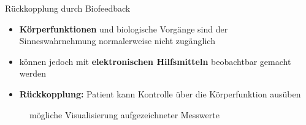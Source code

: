 \documentclass[final,20pt]{beamer}
\newlength{\sepwidth}
\newlength{\colwidth}
\newcommand{\separatorcolumn}{\begin{column}{\sepwidth}\end{column}}
\begin{document}
\begin{frame}[t]
\begin{columns}[t]
\begin{column}{\colwidth}
  \begin{alertblock}{Rückkopplung durch Biofeedback}
  	\begin{itemize}
  		\item \textbf{Körperfunktionen} und biologische Vorgänge sind der Sinneswahrnehmung normalerweise nicht zugänglich
  		\item können jedoch mit \textbf{elektronischen Hilfsmitteln} beobachtbar gemacht werden
  		\item \textbf{Rückkopplung:} Patient kann Kontrolle über die Körperfunktion ausüben
  	\end{itemize}

    \begin{figure}
      \centering
      \caption{mögliche Visualisierung aufgezeichneter Messwerte}
    \end{figure}

  \end{alertblock}

\end{column}

\separatorcolumn
\end{columns}
\end{frame}
\end{document}
